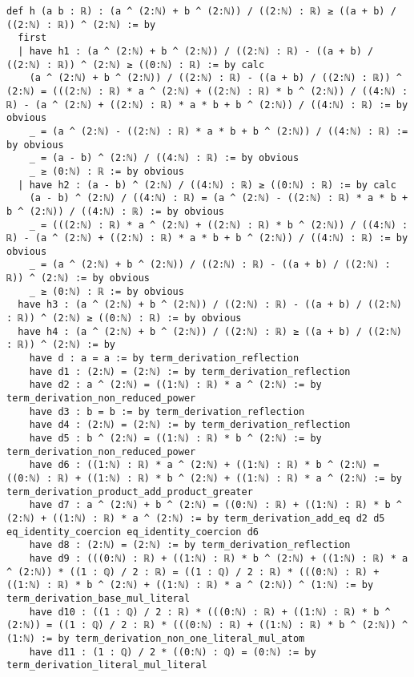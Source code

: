\documentclass{article}
\begin{document}
\begin{tcolorbox}[colback=white!10, width=\linewidth]
\begin{lstlisting}[language=Lean4]
def h (a b : ℝ) : (a ^ (2:ℕ) + b ^ (2:ℕ)) / ((2:ℕ) : ℝ) ≥ ((a + b) / ((2:ℕ) : ℝ)) ^ (2:ℕ) := by
  first
  | have h1 : (a ^ (2:ℕ) + b ^ (2:ℕ)) / ((2:ℕ) : ℝ) - ((a + b) / ((2:ℕ) : ℝ)) ^ (2:ℕ) ≥ ((0:ℕ) : ℝ) := by calc
    (a ^ (2:ℕ) + b ^ (2:ℕ)) / ((2:ℕ) : ℝ) - ((a + b) / ((2:ℕ) : ℝ)) ^ (2:ℕ) = (((2:ℕ) : ℝ) * a ^ (2:ℕ) + ((2:ℕ) : ℝ) * b ^ (2:ℕ)) / ((4:ℕ) : ℝ) - (a ^ (2:ℕ) + ((2:ℕ) : ℝ) * a * b + b ^ (2:ℕ)) / ((4:ℕ) : ℝ) := by obvious
    _ = (a ^ (2:ℕ) - ((2:ℕ) : ℝ) * a * b + b ^ (2:ℕ)) / ((4:ℕ) : ℝ) := by obvious
    _ = (a - b) ^ (2:ℕ) / ((4:ℕ) : ℝ) := by obvious
    _ ≥ (0:ℕ) : ℝ := by obvious
  | have h2 : (a - b) ^ (2:ℕ) / ((4:ℕ) : ℝ) ≥ ((0:ℕ) : ℝ) := by calc
    (a - b) ^ (2:ℕ) / ((4:ℕ) : ℝ) = (a ^ (2:ℕ) - ((2:ℕ) : ℝ) * a * b + b ^ (2:ℕ)) / ((4:ℕ) : ℝ) := by obvious
    _ = (((2:ℕ) : ℝ) * a ^ (2:ℕ) + ((2:ℕ) : ℝ) * b ^ (2:ℕ)) / ((4:ℕ) : ℝ) - (a ^ (2:ℕ) + ((2:ℕ) : ℝ) * a * b + b ^ (2:ℕ)) / ((4:ℕ) : ℝ) := by obvious
    _ = (a ^ (2:ℕ) + b ^ (2:ℕ)) / ((2:ℕ) : ℝ) - ((a + b) / ((2:ℕ) : ℝ)) ^ (2:ℕ) := by obvious
    _ ≥ (0:ℕ) : ℝ := by obvious
  have h3 : (a ^ (2:ℕ) + b ^ (2:ℕ)) / ((2:ℕ) : ℝ) - ((a + b) / ((2:ℕ) : ℝ)) ^ (2:ℕ) ≥ ((0:ℕ) : ℝ) := by obvious
  have h4 : (a ^ (2:ℕ) + b ^ (2:ℕ)) / ((2:ℕ) : ℝ) ≥ ((a + b) / ((2:ℕ) : ℝ)) ^ (2:ℕ) := by
    have d : a = a := by term_derivation_reflection
    have d1 : (2:ℕ) = (2:ℕ) := by term_derivation_reflection
    have d2 : a ^ (2:ℕ) = ((1:ℕ) : ℝ) * a ^ (2:ℕ) := by term_derivation_non_reduced_power
    have d3 : b = b := by term_derivation_reflection
    have d4 : (2:ℕ) = (2:ℕ) := by term_derivation_reflection
    have d5 : b ^ (2:ℕ) = ((1:ℕ) : ℝ) * b ^ (2:ℕ) := by term_derivation_non_reduced_power
    have d6 : ((1:ℕ) : ℝ) * a ^ (2:ℕ) + ((1:ℕ) : ℝ) * b ^ (2:ℕ) = ((0:ℕ) : ℝ) + ((1:ℕ) : ℝ) * b ^ (2:ℕ) + ((1:ℕ) : ℝ) * a ^ (2:ℕ) := by term_derivation_product_add_product_greater
    have d7 : a ^ (2:ℕ) + b ^ (2:ℕ) = ((0:ℕ) : ℝ) + ((1:ℕ) : ℝ) * b ^ (2:ℕ) + ((1:ℕ) : ℝ) * a ^ (2:ℕ) := by term_derivation_add_eq d2 d5 eq_identity_coercion eq_identity_coercion d6
    have d8 : (2:ℕ) = (2:ℕ) := by term_derivation_reflection
    have d9 : (((0:ℕ) : ℝ) + ((1:ℕ) : ℝ) * b ^ (2:ℕ) + ((1:ℕ) : ℝ) * a ^ (2:ℕ)) * ((1 : ℚ) / 2 : ℝ) = ((1 : ℚ) / 2 : ℝ) * (((0:ℕ) : ℝ) + ((1:ℕ) : ℝ) * b ^ (2:ℕ) + ((1:ℕ) : ℝ) * a ^ (2:ℕ)) ^ (1:ℕ) := by term_derivation_base_mul_literal
    have d10 : ((1 : ℚ) / 2 : ℝ) * (((0:ℕ) : ℝ) + ((1:ℕ) : ℝ) * b ^ (2:ℕ)) = ((1 : ℚ) / 2 : ℝ) * (((0:ℕ) : ℝ) + ((1:ℕ) : ℝ) * b ^ (2:ℕ)) ^ (1:ℕ) := by term_derivation_non_one_literal_mul_atom
    have d11 : (1 : ℚ) / 2 * ((0:ℕ) : ℚ) = (0:ℕ) := by term_derivation_literal_mul_literal

\end{lstlisting}
\end{tcolorbox}
\end{document}
